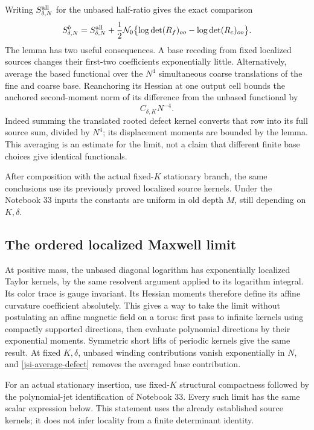 \documentclass[11pt]{article}
\theoremstyle{remark}
\begin{document}
Writing \(S_{\delta,N}^{\rm all}\) for the unbased half-ratio gives
the exact comparison
\begin{equation}
 S_{\delta,N}^b=S_{\delta,N}^{\rm all}
 +\frac12\mathcal N_0\bigl\{
       \log\det(R_f)_{oo}-\log\det(R_c)_{oo}\bigr\}.
 \label{jsi-defect}
\end{equation}
The lemma has two useful consequences. A base receding from fixed
localized sources changes their first-two coefficients
exponentially little. Alternatively, average the based functional
over the \(N^4\) simultaneous coarse translations of the fine and
coarse base. Reanchoring its Hessian at one output cell bounds the
anchored second-moment norm of its difference from the unbased
functional by
\begin{equation}
                         C_{\delta,K}N^{-4}.
 \label{jsi-average-defect}
\end{equation}
Indeed summing the translated rooted defect kernel converts that
row into its full source sum, divided by \(N^4\); its displacement
moments are bounded by the lemma. This averaging is an estimate
for the limit, not a claim that different finite base choices
give identical functionals.

After composition with the actual fixed-\(K\) stationary branch,
the same conclusions use its previously proved localized source
kernels. Under the Notebook 33 inputs the constants are uniform
in old depth \(M\), still depending on \(K,\delta\).

\subsection{The ordered localized Maxwell limit}
\label{jsi-ordered-section}

At positive mass, the unbased diagonal logarithm has exponentially
localized Taylor kernels, by the same resolvent argument applied
to its logarithm integral. Its color trace is gauge invariant.
Its Hessian moments therefore define its affine curvature
coefficient absolutely. This gives a way to take the limit without
postulating an affine magnetic field on a torus: first pass to
infinite kernels using compactly supported directions, then
evaluate polynomial directions by their exponential moments.
Symmetric short lifts of periodic kernels give the same result.
At fixed \(K,\delta\), unbased winding contributions vanish
exponentially in \(N\), and \eqref{jsi-average-defect} removes the
averaged base contribution.

For an actual stationary insertion, use fixed-\(K\) structural
compactness followed by the polynomial-jet identification of
Notebook 33. Every such limit has the same scalar expression
below. This statement uses the already established source kernels;
it does not infer locality from a finite determinant identity.
\end{document}
